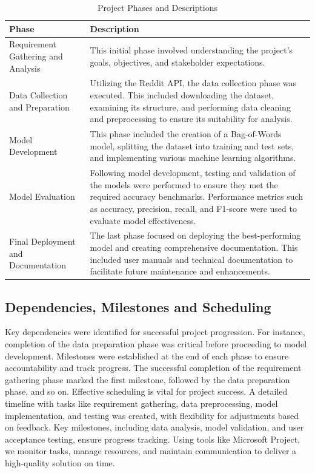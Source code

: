 \begin{table}[H]
    \centering
    \caption*{Project Phases and Descriptions}
    \label{tab:project_phases}
    \begin{tabularx}{\textwidth}{|p{4cm}|X|}
    \hline
    \textbf{Phase} & \textbf{Description} \\ \hline
    Requirement Gathering and Analysis & This initial phase involved understanding the project's goals, objectives, and stakeholder expectations. \\ \hline
    Data Collection and Preparation & Utilizing the Reddit API, the data collection phase was executed. This included downloading the dataset, examining its structure, and performing data cleaning and preprocessing to ensure its suitability for analysis. \\ \hline
    Model Development & This phase included the creation of a Bag-of-Words model, splitting the dataset into training and test sets, and implementing various machine learning algorithms. \\ \hline
    Model Evaluation & Following model development, testing and validation of the models were performed to ensure they met the required accuracy benchmarks. Performance metrics such as accuracy, precision, recall, and F1-score were used to evaluate model effectiveness. \\ \hline
    Final Deployment and Documentation & The last phase focused on deploying the best-performing model and creating comprehensive documentation. This included user manuals and technical documentation to facilitate future maintenance and enhancements. \\ \hline
    \end{tabularx}
\end{table}

\subsection{Dependencies, Milestones and Scheduling} 
\noindent
Key dependencies were identified for successful project progression. For instance, completion of the data preparation phase was critical before proceeding to model development. Milestones were established at the end of each phase to ensure accountability and track progress. The successful completion of the requirement gathering phase marked the first milestone, followed by the data preparation phase, and so on. Effective scheduling is vital for project success. A detailed timeline with tasks like requirement gathering, data preprocessing, model implementation, and testing was created, with flexibility for adjustments based on feedback. Key milestones, including data analysis, model validation, and user acceptance testing, ensure progress tracking. Using tools like Microsoft Project, we monitor tasks, manage resources, and maintain communication to deliver a high-quality solution on time.



